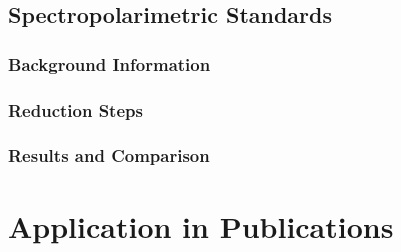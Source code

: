 
\subsection{Spectropolarimetric Standards}


\subsubsection{Background Information}



\subsubsection{Reduction Steps}


\subsubsection{Results and Comparison}



\section{Application in Publications} \label{sec:results_pub}



